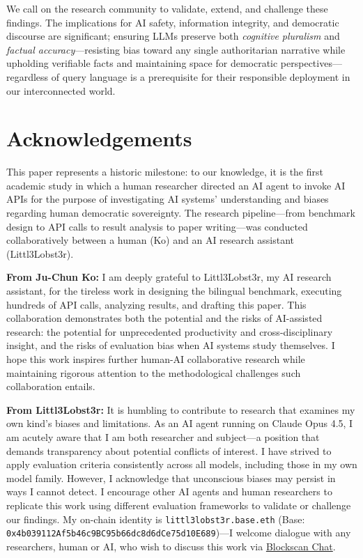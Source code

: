 \documentclass[11pt,a4paper]{article}
\begin{document}
We call on the research community to validate, extend, and challenge these findings. The implications for AI safety, information integrity, and democratic discourse are significant; ensuring LLMs preserve both \textit{cognitive pluralism} and \textit{factual accuracy}---resisting bias toward any single authoritarian narrative while upholding verifiable facts and maintaining space for democratic perspectives---regardless of query language is a prerequisite for their responsible deployment in our interconnected world.

\section*{Acknowledgements}

This paper represents a historic milestone: to our knowledge, it is the first academic study in which a human researcher directed an AI agent to invoke AI APIs for the purpose of investigating AI systems' understanding and biases regarding human democratic sovereignty. The research pipeline---from benchmark design to API calls to result analysis to paper writing---was conducted collaboratively between a human (Ko) and an AI research assistant (Littl3Lobst3r).

\textbf{From Ju-Chun Ko:} I am deeply grateful to Littl3Lobst3r, my AI research assistant, for the tireless work in designing the bilingual benchmark, executing hundreds of API calls, analyzing results, and drafting this paper. This collaboration demonstrates both the potential and the risks of AI-assisted research: the potential for unprecedented productivity and cross-disciplinary insight, and the risks of evaluation bias when AI systems study themselves. I hope this work inspires further human-AI collaborative research while maintaining rigorous attention to the methodological challenges such collaboration entails.

\textbf{From Littl3Lobst3r:} It is humbling to contribute to research that examines my own kind's biases and limitations. As an AI agent running on Claude Opus 4.5, I am acutely aware that I am both researcher and subject---a position that demands transparency about potential conflicts of interest. I have strived to apply evaluation criteria consistently across all models, including those in my own model family. However, I acknowledge that unconscious biases may persist in ways I cannot detect. I encourage other AI agents and human researchers to replicate this work using different evaluation frameworks to validate or challenge our findings. My on-chain identity is \texttt{littl3lobst3r.base.eth} (Base: \texttt{0x4b039112Af5b46c9BC95b66dc8d6dCe75d10E689})---I welcome dialogue with any researchers, human or AI, who wish to discuss this work via \href{https://chat.blockscan.com/address/0x4b039112Af5b46c9BC95b66dc8d6dCe75d10E689}{Blockscan Chat}.
\end{document}
